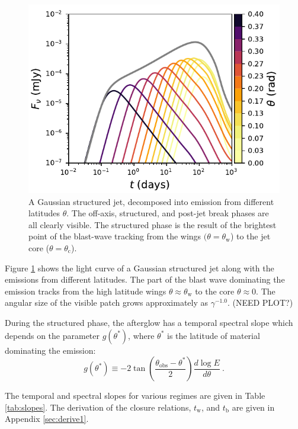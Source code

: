\documentclass[twocolumn]{aastex62}
\newcommand{\tW}{\ensuremath{t_{\mathrm{w}}}}
\newcommand{\tb}{\ensuremath{t_{\mathrm{b}}}}
\newcommand{\thobs}{\ensuremath{\theta_{\mathrm{obs}}}}
\newcommand{\thW}{\ensuremath{\theta_{\mathrm{w}}}}
\newcommand{\thC}{\ensuremath{\theta_{\mathrm{c}}}}
\begin{document}
\begin{figure}
	\includegraphics[width=\columnwidth]{figs/jetDecomp.pdf}
	\caption{A Gaussian structured jet, decomposed into emission from different latitudes $\theta$.  The off-axis, structured, and post-jet break phases are all clearly visible.  The structured phase is the result of the brightest point of the blast-wave tracking from the wings $(\theta =\thW$) to the jet core ($\theta=\thC$). \label{fig:decomp}}
\end{figure}
Figure \ref{fig:decomp} shows the light curve of a Gaussian structured jet along with the emissions from different latitudes.  The part of the blast wave dominating the emission tracks from the high latitude wings $\theta \approx \thW$ to the core $\theta \approx 0$. The angular size of the visible patch grows approximately as $\gamma^{-1.0}$. (NEED PLOT?)

During the structured phase, the afterglow has a temporal spectral slope which depends on the parameter $g(\theta^*)$, where $\theta^*$ is the latitude of material dominating the emission:
\begin{equation}
	g(\theta^*) \equiv -2 \tan\left(\frac{\thobs - \theta^*}{2}\right)\frac{d \log E}{d \theta}\ . \label{eq:gdef}
\end{equation}

The temporal and spectral slopes for various regimes are given in Table \ref{tab:slopes}.  The derivation of the closure relations, $\tW$, and $\tb$ are given in Appendix \ref{sec:derive1}.
\end{document}
